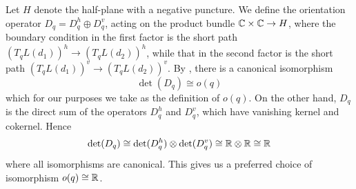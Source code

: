 \documentclass[12pt]{amsart}
\begin{document}
Let $H$ denote the half-plane with a negative puncture. We define the
orientation operator $D_q = D_q^h \oplus D_q^v$, acting on the product
bundle $\mathbb{C}\times \mathbb{C} \to H$, where the boundary condition in the first
factor is the short path $(T_qL(d_1))^h\to (T_qL(d_2))^h$, while that
in the second factor is the short path $(T_qL(d_1))^v \to
(T_qL(d_2))^v$. By \cite[Eq. (11.39)]{seidel-book}, there is a
canonical isomorphism
\begin{equation}
  \det(D_q) \cong o(q)
\end{equation}
which for our purposes we take as the definition of $o(q)$.  On the
other hand, $D_q$ is the direct sum of the operators $D_q^h$ and
$D_q^v$, which have vanishing kernel and cokernel. Hence
\begin{equation}
  \det(D_q) \cong \det(D_q^h)\otimes \det(D_q^v) \cong \mathbb{R} \otimes \mathbb{R}
  \cong \mathbb{R}
\end{equation}
where all isomorphisms are canonical. This gives us a preferred choice
of isomorphism $o(q) \cong \mathbb{R}$.
\end{document}
